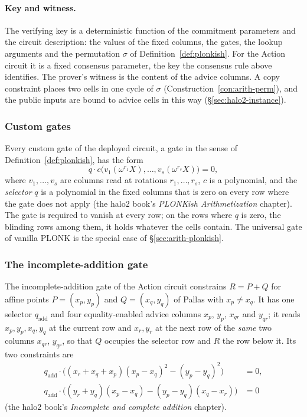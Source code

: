 \documentclass[11pt,a4paper]{article}
\theoremstyle{definition}
\begin{document}
\paragraph{Key and witness.}
The verifying key is a deterministic function of the commitment
parameters and the circuit description: the values of the fixed columns,
the gates, the lookup arguments and the permutation $\sigma$ of
Definition~\ref{def:plonkish}. For the Action circuit it is a fixed
consensus parameter, the key the consensus rule above identifies. The
prover's witness is the content of the advice columns. A copy constraint
places two cells in one cycle of $\sigma$
(Construction~\ref{con:arith-perm}), and the public inputs are bound to
advice cells in this way (\S\ref{sec:halo2-instance}).

\subsubsection{Custom gates}
\label{sec:halo2-gates}

Every custom gate of the deployed circuit, a gate in the sense of
Definition~\ref{def:plonkish}, has the form
\[
q \cdot c\bigl(v_1(\omega^{r_1}X), \dots, v_s(\omega^{r_s}X)\bigr) = 0,
\]
where $v_1, \dots, v_s$ are columns read at rotations $r_1, \dots, r_s$,
$c$ is a polynomial, and the \emph{selector} $q$ is a polynomial in the
fixed columns that is zero on every row where the gate does not apply
(the halo2 book's \emph{PLONKish Arithmetization} chapter). The gate is
required to vanish at every row; on the rows where $q$ is zero, the
blinding rows among them, it holds whatever the cells contain. The
universal gate of vanilla PLONK is the special case of
\S\ref{sec:arith-plonkish}.

\subsubsection{The incomplete-addition gate}
\label{sec:halo2-addinc}

The incomplete-addition gate of the Action circuit constrains $R = P + Q$
for affine points $P = (x_p, y_p)$ and $Q = (x_q, y_q)$ of Pallas with
$x_p \ne x_q$. It has one selector $q_{\mathrm{add}}$ and four
equality-enabled advice columns $x_p$, $y_p$, $x_{qr}$ and $y_{qr}$; it
reads $x_p, y_p, x_q, y_q$ at the current row and $x_r, y_r$ at the next
row of the \emph{same} two columns $x_{qr}$, $y_{qr}$, so that $Q$
occupies the selector row and $R$ the row below it. Its two constraints
are
\begin{align}
q_{\mathrm{add}}\cdot\bigl((x_r + x_q + x_p)(x_p - x_q)^2
  - (y_p - y_q)^2\bigr) &= 0, \label{eq:halo2-addinc-xr}\\
q_{\mathrm{add}}\cdot\bigl((y_r + y_q)(x_p - x_q)
  - (y_p - y_q)(x_q - x_r)\bigr) &= 0 \label{eq:halo2-addinc-yr}
\end{align}
(the halo2 book's \emph{Incomplete and complete addition} chapter).
\end{document}
